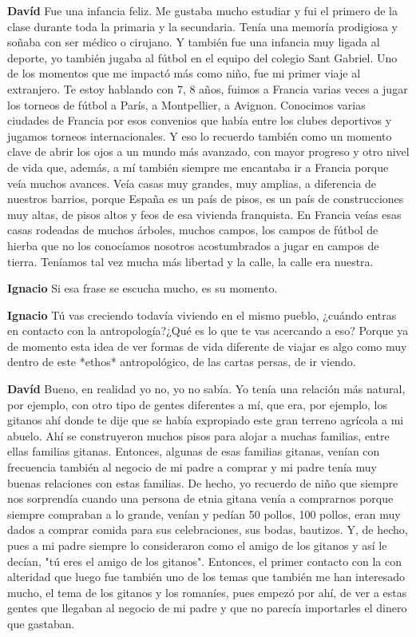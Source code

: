 \documentclass[
  spanish,
  11pt,
  a4paper,
]{scrbook}
\newenvironment{transcripcion}{
    \begin{list}{}{
        \setlength{\leftmargin}{1.5em}  %
        \setlength{\rightmargin}{0em}
        \setlength{\itemsep}{0.2em}     %
        \setlength{\parsep}{0.0em}
        \setlength{\listparindent}{0pt}
    }
}{
    \end{list}
}
\newcommand{\personaje}[1]{\textbf{#1}\quad}
\begin{document}
\begin{transcripcion}
\item \personaje{Davíd} Fue una infancia feliz. Me gustaba mucho estudiar y fui el primero de la clase durante toda la primaria y la secundaria. Tenía una memoría prodigiosa y soñaba con ser médico o cirujano. Y también fue una infancia muy ligada al deporte, yo también jugaba al fútbol en el equipo del colegio Sant Gabriel. Uno de los momentos que me impactó más como niño, fue mi primer viaje al extranjero. Te estoy hablando con 7, 8 años, fuimos a Francia varias veces a jugar los torneos de fútbol a París, a Montpellier, a Avignon. Conocimos varias ciudades de Francia por esos convenios que había entre los clubes deportivos y jugamos torneos internacionales. Y eso lo recuerdo también como un momento clave de abrir los ojos a un mundo más avanzado, con mayor progreso y otro nivel de vida que, además, a mí también siempre me encantaba ir a Francia porque veía muchos avances. Veía casas muy grandes, muy amplias, a diferencia de nuestros barrios, porque España es un país de pisos, es un país de construcciones muy altas, de pisos altos y feos de esa vivienda franquista. En Francia veías esas casas rodeadas de muchos árboles, muchos campos, los campos de fútbol de hierba que no los conocíamos nosotros acostumbrados a jugar en campos de tierra. Teníamos tal vez mucha más libertad y la calle, la calle era nuestra.

\item \personaje{Ignacio} Si esa frase se escucha mucho, es su momento.

\item \personaje{Ignacio} Tú vas creciendo todavía viviendo en el mismo pueblo, ¿cuándo entras en contacto con la antropología?¿Qué es lo que te vas acercando a eso? Porque ya de momento esta idea de ver formas de vida diferente de viajar es algo como muy dentro de este *ethos* antropológico, de las cartas persas, de ir viendo.

\item \personaje{Davíd} Bueno, en realidad yo no, yo no sabía. Yo tenía una relación más natural, por ejemplo, con otro tipo de gentes diferentes a mí, que era, por ejemplo, los gitanos ahí donde te dije que se había expropiado este gran terreno agrícola a mi abuelo. Ahí se construyeron muchos pisos para alojar a muchas familias, entre ellas familias gitanas. Entonces, algunas de esas familias gitanas, venían con frecuencia también al negocio de mi padre a comprar y mi padre tenía muy buenas relaciones con estas familias. De hecho, yo recuerdo de niño que siempre nos sorprendía cuando una persona de etnia gitana venía a comprarnos porque siempre compraban a lo grande, venían y pedían 50 pollos, 100 pollos, eran muy dados a comprar comida para sus celebraciones, sus bodas, bautizos. Y, de hecho, pues a mi padre siempre lo consideraron como el amigo de los gitanos y así le decían, "tú eres el amigo de los gitanos". Entonces, el primer contacto con la con alteridad que luego fue también uno de los temas que también me han interesado mucho, el tema de los gitanos y los romaníes, pues empezó por ahí, de ver a estas gentes que llegaban al negocio de mi padre y que no parecía importarles el dinero que gastaban.


\end{transcripcion}
\end{document}
